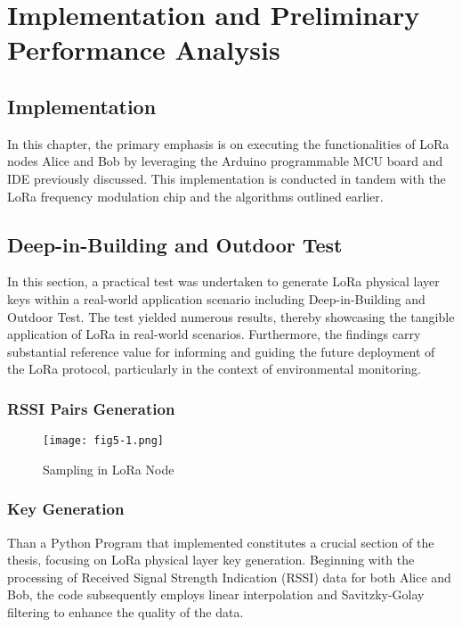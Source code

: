
\chapter{Implementation and Preliminary Performance Analysis}

\section{Implementation}
In this chapter, the primary emphasis is on executing the functionalities of LoRa nodes Alice and Bob by leveraging the Arduino programmable MCU board and IDE previously discussed. This implementation is conducted in tandem with the LoRa frequency modulation chip and the algorithms outlined earlier.

\section{Deep-in-Building and Outdoor Test}
In this section, a practical test was undertaken to generate LoRa physical layer keys within a real-world application scenario including Deep-in-Building and Outdoor Test. The test yielded numerous results, thereby showcasing the tangible application of LoRa in real-world scenarios. Furthermore, the findings carry substantial reference value for informing and guiding the future deployment of the LoRa protocol, particularly in the context of environmental monitoring.

\subsection{RSSI Pairs Generation}

\begin{figure}
  \centering
  \texttt{[image: fig5-1.png]}
  \caption{Sampling in LoRa Node}
  \label{fig:5-1}
\end{figure}

\subsection{Key Generation}
Than a Python Program that implemented constitutes a crucial section of the thesis, focusing on LoRa physical layer key generation. Beginning with the processing of Received Signal Strength Indication (RSSI) data for both Alice and Bob, the code subsequently employs linear interpolation and Savitzky-Golay filtering to enhance the quality of the data.

